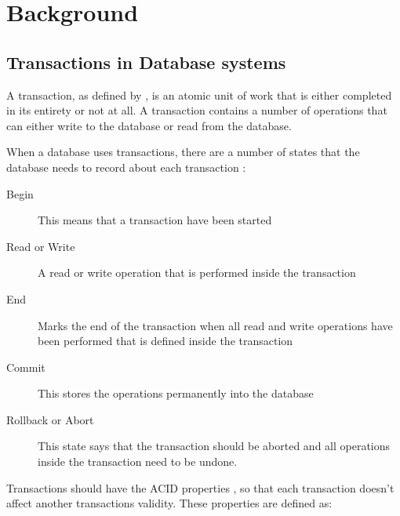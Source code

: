 
\section{Background} %
\label{sec:background}

\subsection{Transactions in Database systems}
\label{sub:db}

A transaction, as defined by \cite{Elmasri2004}, is an atomic unit of work that is either completed in its entirety or not at all. A transaction contains a number of operations that can either write to the database or read from the database. 

When a database uses transactions, there are a number of states that the database needs to record about each transaction \cite[]{Elmasri2004}:

\begin{description}
	\item[Begin] This means that a transaction have been started
	\item[Read or Write] A read or write operation that is performed inside the transaction
	\item[End] Marks the end of the transaction when all read and write operations have been performed that is defined inside the transaction
	\item[Commit] This stores the operations permanently into the database 
	\item[Rollback or Abort] This state says that the transaction should be aborted and all operations inside the transaction need to be undone.
\end{description}


Transactions should have the ACID properties \cite[]{Haerder83}, so that each transaction doesn't affect another transactions validity. These properties are defined as:

